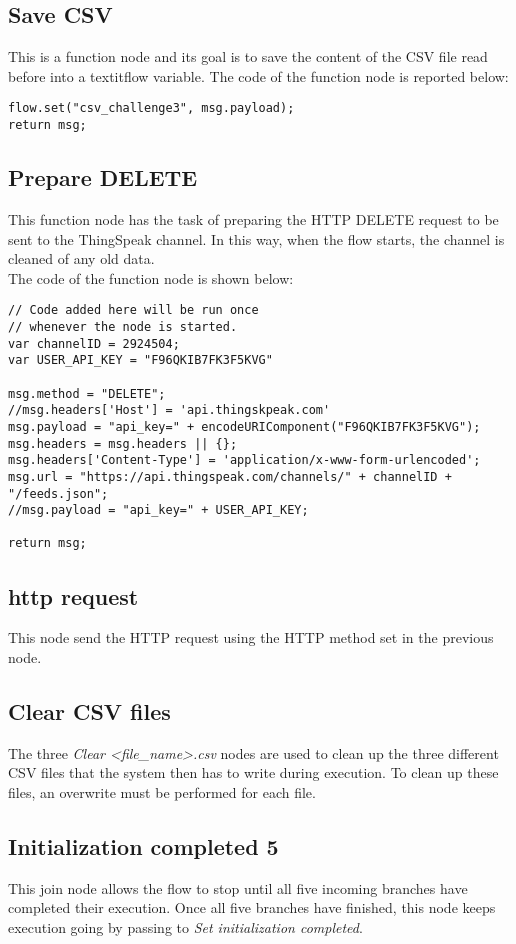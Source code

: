 \subsection{Save CSV}
This is a function node and its goal is to save the content of the CSV file read before into a textit{flow} variable.
The code of the function node is reported below:
\begin{verbatim}
flow.set("csv_challenge3", msg.payload);
return msg;
\end{verbatim}

\subsection{Prepare DELETE}
This function node has the task of preparing the HTTP DELETE request to be sent to the ThingSpeak channel.
In this way, when the flow starts, the channel is cleaned of any old data.\\
The code of the function node is shown below:
\begin{verbatim}
// Code added here will be run once
// whenever the node is started.
var channelID = 2924504;
var USER_API_KEY = "F96QKIB7FK3F5KVG"

msg.method = "DELETE";
//msg.headers['Host'] = 'api.thingskpeak.com'
msg.payload = "api_key=" + encodeURIComponent("F96QKIB7FK3F5KVG");
msg.headers = msg.headers || {};
msg.headers['Content-Type'] = 'application/x-www-form-urlencoded';
msg.url = "https://api.thingspeak.com/channels/" + channelID + "/feeds.json";
//msg.payload = "api_key=" + USER_API_KEY;

return msg;
\end{verbatim}

\subsection{http request}
This node send the HTTP request using the HTTP method set in the previous node.

\subsection{Clear CSV files}
The three \textit{Clear <file\_name>.csv} nodes are used to clean up the three different CSV files that the system then has to write during execution. To clean up these files, an overwrite must be performed for each file.

\subsection{Initialization completed 5}
This join node allows the flow to stop until all five incoming branches have completed their execution. Once all five branches have finished, this node keeps execution going by passing to \textit{Set initialization completed}.

